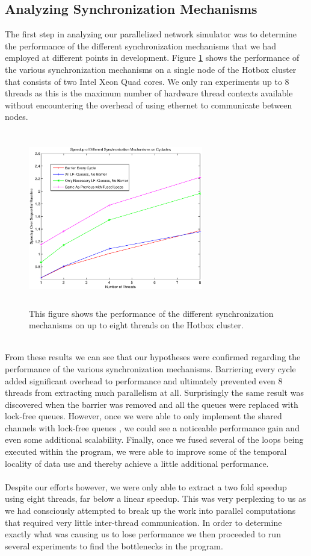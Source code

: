 \documentclass[twocolumn]{article}
\begin{document}
\subsection{Analyzing Synchronization Mechanisms}
The first step in analyzing our parallelized network simulator was to
determine the performance of the different synchronization mechanisms that
we had employed at different points in development.  Figure \ref{synch}
shows the performance of the various synchronization mechanisms on a
single node of the Hotbox cluster that consists of two Intel Xeon Quad
cores.  We only ran experiments up to 8 threads as this is the maximum
number of hardware thread contexts available without encountering the
overhead of using ethernet to communicate between nodes.\\
\begin{figure}[h]
\centering
\includegraphics[width=3in,height=3in]{synch.eps}
\caption{\label{synch} This figure shows the performance of the different
synchronization mechanisms on up to eight threads on the Hotbox cluster.}
\end{figure}
~\\
From these results we can see that our hypotheses were confirmed regarding
the performance of the various synchronization mechanisms.  Barriering
every cycle added significant overhead to performance and ultimately
prevented even 8 threads from extracting much parallelism at all.
Surprisingly the same result was discovered when the barrier was removed and
all the queues were replaced with lock-free queues.  However, once we were
able to only implement the shared channels with lock-free queues , we could see a noticeable performance gain and even some
additional scalability.  Finally, once we fused several of the loops being
executed within the program, we were able to improve some of the temporal
locality of data use and thereby achieve a little additional
performance.\\
~\\
Despite our efforts however, we were only able to extract a two fold
speedup using eight threads, far below a linear speedup.  This was very
perplexing to us as we had consciously attempted to break up the work into
parallel computations that required very little inter-thread
communication.  In order to determine exactly what was causing us to lose
performance we then proceeded to run several experiments to find the
bottlenecks in the program.
\end{document}
